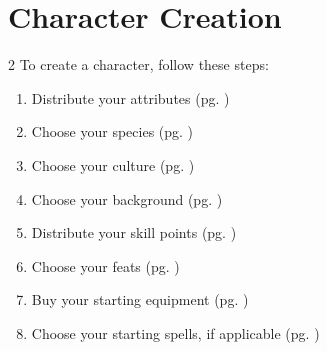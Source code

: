 \chapter{Character Creation}\label{character-creation}

\begin{multicols}{2}
    To create a character, follow these steps:
    \begin{enumerate}
        \item Distribute your attributes (pg. \pageref{attributes})
        \item Choose your species (pg. \pageref{species})
        \item Choose your culture (pg. \pageref{culture})
        \item Choose your background (pg. \pageref{background})
        \item Distribute your skill points (pg. \pageref{skills})
        \item Choose your feats (pg. \pageref{feats})
        \item Buy your starting equipment (pg. \pageref{equipment})
        \item Choose your starting spells, if applicable (pg. \pageref{magic})
    \end{enumerate}


\end{multicols}
